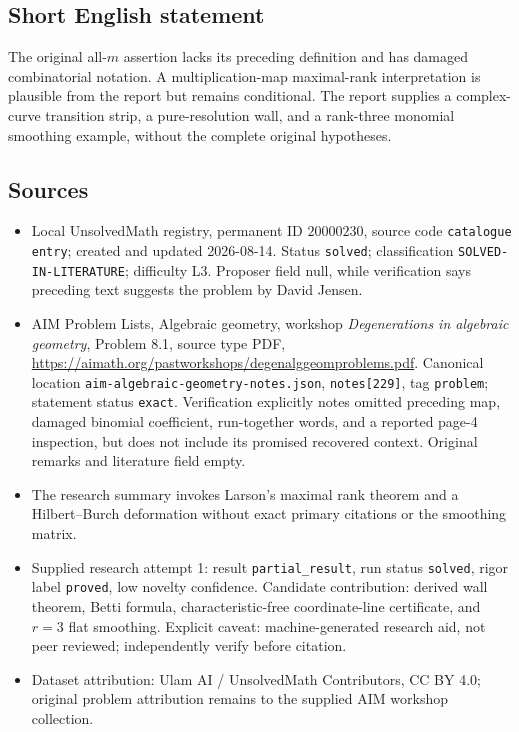\documentclass[11pt]{article}
\begin{document}
\subsection{Short English statement}
The original all-$m$ assertion lacks its preceding definition and has damaged combinatorial notation. A multiplication-map maximal-rank interpretation is plausible from the report but remains conditional. The report supplies a complex-curve transition strip, a pure-resolution wall, and a rank-three monomial smoothing example, without the complete original hypotheses.
\subsection{Sources}
\begin{itemize}
\item Local UnsolvedMath registry, permanent ID $20000230$, source code \texttt{catalogue entry}; created and updated 2026-08-14. Status \texttt{solved}; classification \texttt{SOLVED-IN-LITERATURE}; difficulty L3. Proposer field null, while verification says preceding text suggests the problem by David Jensen.
\item AIM Problem Lists, Algebraic geometry, workshop \emph{Degenerations in algebraic geometry}, Problem 8.1, source type PDF, \url{https://aimath.org/pastworkshops/degenalggeomproblems.pdf}. Canonical location \texttt{aim-algebraic-geometry-notes.json}, \texttt{notes[229]}, tag \texttt{problem}; statement status \texttt{exact}. Verification explicitly notes omitted preceding map, damaged binomial coefficient, run-together words, and a reported page-4 inspection, but does not include its promised recovered context. Original remarks and literature field empty.
\item The research summary invokes Larson's maximal rank theorem and a Hilbert--Burch deformation without exact primary citations or the smoothing matrix.
\item Supplied research attempt 1: result \texttt{partial\_result}, run status \texttt{solved}, rigor label \texttt{proved}, low novelty confidence. Candidate contribution: derived wall theorem, Betti formula, characteristic-free coordinate-line certificate, and $r=3$ flat smoothing. Explicit caveat: machine-generated research aid, not peer reviewed; independently verify before citation.
\item Dataset attribution: Ulam AI / UnsolvedMath Contributors, CC BY 4.0; original problem attribution remains to the supplied AIM workshop collection.
\end{itemize}
\end{document}
